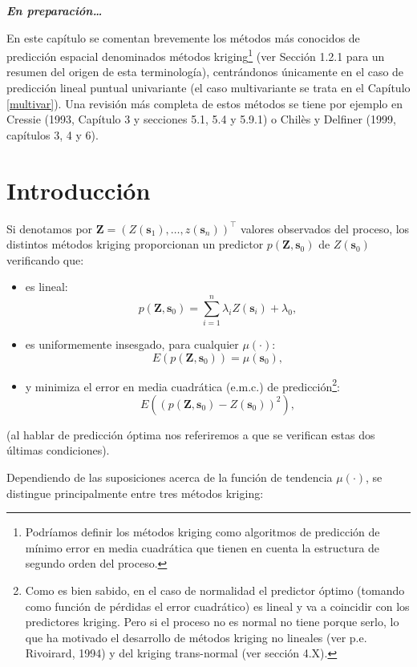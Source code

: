 \documentclass[
  spanish,
]{book}
\theoremstyle{break}
\theoremstyle{definition}
\theoremstyle{definition}
\theoremstyle{definition}
\theoremstyle{definition}
\theoremstyle{remark}
\begin{document}
\textbf{\emph{En preparación\ldots{}}}

En este capítulo se comentan brevemente los métodos más conocidos de predicción espacial denominados métodos kriging\footnote{Podríamos definir los métodos kriging como algoritmos de predicción de mínimo error en media cuadrática que tienen en cuenta la estructura de segundo orden del proceso.} (ver Sección 1.2.1 para un resumen del origen de esta terminología), centrándonos únicamente en el caso de predicción lineal puntual univariante (el caso multivariante se trata en el Capítulo \ref{multivar}).
Una revisión más completa de estos métodos se tiene por ejemplo en Cressie (1993, Capítulo 3 y secciones 5.1, 5.4 y 5.9.1) o Chilès y Delfiner (1999, capítulos 3, 4 y 6).

\hypertarget{introducciuxf3n}{%
\section{Introducción}\label{introducciuxf3n}}

Si denotamos por \(\mathbf{Z}=\left( Z(\mathbf{s}_{1} ), \ldots, z(\mathbf{s}_{n} )\right)^\top\) valores observados del proceso, los distintos métodos kriging proporcionan un predictor \(p(\mathbf{Z},\mathbf{s}_{0} )\) de \(Z(\mathbf{s}_{0} )\) verificando que:

\begin{itemize}
\item
  es lineal:
  \[p(\mathbf{Z},\mathbf{s}_{0} )=\sum\limits_{i=1}^{n}\lambda_{i} Z(\mathbf{s}_{i} ) +\lambda_{0},\]
\item
  es uniformemente insesgado, para cualquier \(\mu(\cdot)\):
  \[E(p(\mathbf{Z},\mathbf{s}_{0} ))=\mu(\mathbf{s}_{0} ),\]
\item
  y minimiza el error en media cuadrática (e.m.c.) de predicción\footnote{Como es bien sabido, en el caso de normalidad el predictor óptimo (tomando como función de pérdidas el error cuadrático) es lineal y va a coincidir con los predictores kriging. Pero si el proceso no es normal no tiene porque serlo, lo que ha motivado el desarrollo de métodos kriging no lineales (ver p.e. Rivoirard, 1994) y del kriging trans-normal (ver sección 4.X).}:
  \[E\left( \left( p(\mathbf{Z},\mathbf{s}_{0} )-Z(\mathbf{s}_{0} )\right)^{\text{2} } \right),\]
\end{itemize}

(al hablar de predicción óptima nos referiremos a que se verifican estas dos últimas condiciones).

Dependiendo de las suposiciones acerca de la función de tendencia \(\mu(\cdot)\), se distingue principalmente entre tres métodos kriging:
\end{document}
